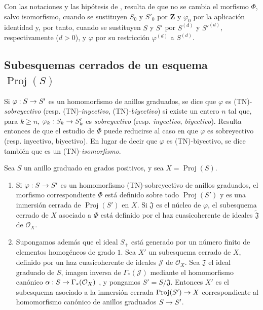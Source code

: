 \documentclass[oneside,10pt]{amsart}
\makeatletter
\renewcommand{\geq}{\geqslant}
\newcommand{\ega@arrow}[2]{\mathchoice{#1}{#2}{#2}{#2}}
\renewcommand{\to}{\ega@arrow{\longrightarrow}{\rightarrow}}
\newcommand{\oldpage}[2][]{\marginnote{\normalfont\footnotesize\textbf{#1}~|~#2}\ignorespaces}
\let\EGAOriginalLabel\label
\renewcommand{\label}[1]{\phantomsection\EGAOriginalLabel{#1}}
\makeatother
\begin{document}
\oldpage[II]{48}

\begin{env}[2.8.15]
\label{II.2.8.15-fr}
Con las notaciones y las hipótesis de , resulta de  que no se cambia el morfismo $\Phi$, salvo isomorfismo, cuando se sustituyen $S_0$ y $S'_0$ por $\mathbf{Z}$ y $\varphi_0$ por la aplicación identidad y, por tanto, cuando se sustituyen $S$ y $S'$ por $S^{(d)}$ y ${S'}^{(d)}$, respectivamente ($d>0$), y $\varphi$ por su restricción $\varphi^{(d)}$ a $S^{(d)}$.
\end{env}

\subsection{Subesquemas cerrados de un esquema $\operatorname{Proj}(S)$}
\label{subsection:II.2.9-fr}

\begin{env}[2.9.1]
\label{II.2.9.1-fr}
Si $\varphi:S\to S'$ es un homomorfismo de anillos graduados, se dice que $\varphi$ es (TN)-\emph{sobreyectivo} (resp. (TN)-\emph{inyectivo}, (TN)-\emph{biyectivo}) si existe un entero $n$ tal que, para $k\geq n$, $\varphi_k:S_k\to S'_k$ es \emph{sobreyectivo} (resp. \emph{inyectivo}, \emph{biyectivo}).
Resulta entonces de  que el estudio de $\Phi$ puede reducirse al caso en que $\varphi$ es sobreyectivo (resp. inyectivo, biyectivo).
En lugar de decir que $\varphi$ es (TN)-biyectivo, se dice también que es un (TN)-\emph{isomorfismo}.
\end{env}

\begin{proposition}[2.9.2]
\label{II.2.9.2-fr}
Sea $S$ un anillo graduado en grados positivos, y sea $X=\operatorname{Proj}(S)$.
\begin{enumerate}
  \item[{\rm(i)}] Si $\varphi:S\to S'$ es un homomorfismo \textup{(TN)}-sobreyectivo de anillos graduados, el morfismo correspondiente $\Phi$  está definido sobre todo $\operatorname{Proj}(S')$ y es una inmersión cerrada de $\operatorname{Proj}(S')$ en $X$.
    Si $\mathfrak{J}$ es el núcleo de $\varphi$, el subesquema cerrado de $X$ asociado a $\Phi$ está definido por el haz cuasicoherente de ideales $\widetilde{\mathfrak{J}}$ de $\mathcal{O}_X$.
  \item[{\rm(ii)}] Supongamos además que el ideal $S_+$ está generado por un número finito de elementos homogéneos de grado $1$.
    Sea $X'$ un subesquema cerrado de $X$, definido por un haz cuasicoherente de ideales $\mathcal{J}$ de $\mathcal{O}_X$.
    Sea $\mathfrak{J}$ el ideal graduado de $S$, imagen inversa de $\Gamma_*(\mathcal{J})$ mediante el homomorfismo canónico $\alpha:S\to\Gamma_*(\mathcal{O}_X)$ , y pongamos $S'=S/\mathfrak{J}$.
    Entonces $X'$ es el subesquema asociado a la inmersión cerrada $\operatorname{Proj}(S')\to X$ correspondiente al homomorfismo canónico de anillos graduados $S\to S'$.
\end{enumerate}
\end{proposition}
\end{document}
